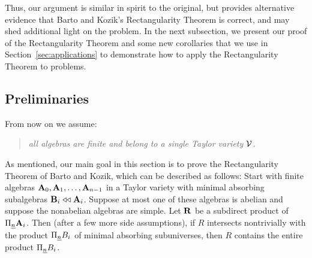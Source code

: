 Thus, our argument is similar in spirit to the original, but
provides alternative evidence that Barto and Kozik's Rectangularity Theorem
is correct, and may shed additional light on the problem.
In the next subsection, we present our proof of the Rectangularity Theorem 
and some new corollaries that we use 
in Section~\ref{sec:applications} to demonstrate 
how to apply the Rectangularity Theorem to \csp problems.

\subsection{Preliminaries}
From now on we assume:
\begin{quote}
\emph{all algebras are finite and belong to a single Taylor variety $\mathcal{V}$.}
\end{quote}
As mentioned, our main goal in this section is to prove the  
Rectangularity Theorem of Barto and Kozik, which can be described as follows:
Start with finite algebras $\mathbf{A}_0, \mathbf{A}_1, \dots, \mathbf{A}_{n-1}$ in a 
Taylor variety with minimal absorbing subalgebras $\mathbf{B}_i \mathrel{\triangleleft\triangleleft} \mathbf{A}_i$.
Suppose at most one of these algebras is abelian and 
suppose the nonabelian algebras are simple.
Let $\mathbf{R}$ be a subdirect product of $\Pi_{\underline{n}} \mathbf{A}_i$.
Then (after a few more side assumptions),
if $R$ intersects nontrivially with the product $\Pi_{\underline{n}}B_i$
of minimal absorbing subuniverses,
then $R$ contains the entire product $\Pi_{\underline{n}}B_i$.



